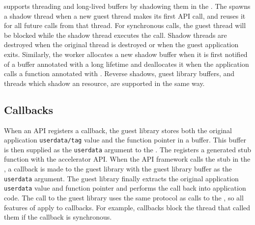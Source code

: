 \AvA supports threading and long-lived buffers by shadowing them in the \worker.
The \worker spawns a shadow thread when a new guest thread makes its first API call, and reuses it for all future calls from that thread.
For synchronous calls, the guest thread will be blocked while the shadow thread executes the call.
Shadow threads are destroyed when the original thread is destroyed or when the guest application exits.
Similarly, the worker allocates a new shadow buffer when it is first notified of a buffer annotated with a long lifetime and
deallocates it when the application calls a function annotated with \lstinline@deallocates@.
Reverse shadows, guest library buffers, and threads which shadow an \worker resource, are supported in the same way.

\subsection{Callbacks}
\label{s:callback}

When an API registers a callback, the guest library stores both the original application \texttt{userdata/tag} value and the function pointer in a buffer.
This buffer is then supplied as the \texttt{userdata} argument to the \worker.
The \worker registers a generated stub function with the accelerator API.
When the API framework calls the stub in the \worker, a callback is made to the guest library with the guest library buffer as the \texttt{userdata} argument.
The guest library finally extracts the original application \texttt{userdata} value and function pointer and performs the call back into application code.
The call to the guest library uses the same protocol as calls to the \worker, so all features of \AvA apply to callbacks.
For example, callbacks block the \worker thread that called them if the callback is synchronous.


